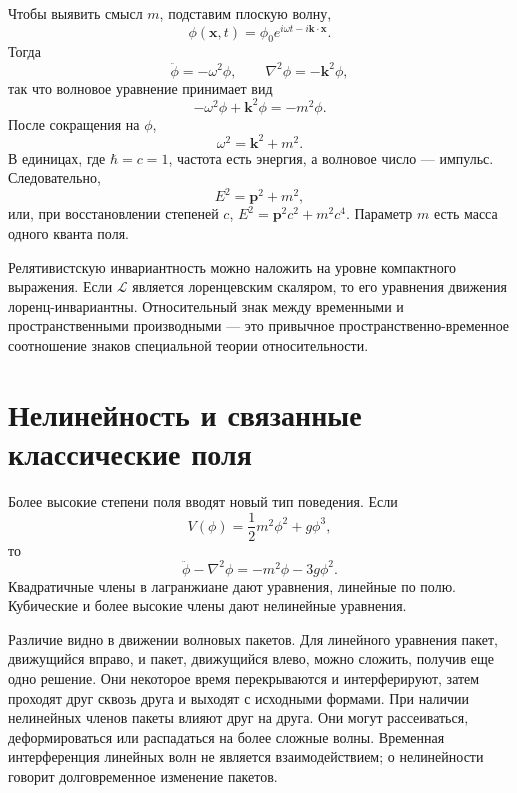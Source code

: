 Чтобы выявить смысл \(m\), подставим плоскую волну,
\begin{equation}
\phi(\mathbf x,t)=\phi_0e^{i\omega t-i\mathbf k\cdot\mathbf x}.
\end{equation}
Тогда
\begin{equation}
\ddot\phi=-\omega^2\phi,
\qquad
\nabla^2\phi=-\mathbf k^2\phi,
\end{equation}
так что волновое уравнение принимает вид
\begin{equation}
-\omega^2\phi+\mathbf k^2\phi=-m^2\phi.
\end{equation}
После сокращения на \(\phi\),
\begin{equation}
\omega^2=\mathbf k^2+m^2.
\end{equation}
В единицах, где \(\hbar=c=1\), частота есть энергия, а волновое число — импульс. Следовательно,
\begin{equation}
E^2=\mathbf p^2+m^2,
\end{equation}
или, при восстановлении степеней \(c\), \(E^2=\mathbf p^2c^2+m^2c^4\). Параметр \(m\) есть масса одного кванта поля.

Релятивистскую инвариантность можно наложить на уровне компактного выражения. Если \(\mathcal L\) является лоренцевским скаляром, то его уравнения движения лоренц-инвариантны. Относительный знак между временными и пространственными производными — это привычное пространственно-временное соотношение знаков специальной теории относительности.

\section{Нелинейность и связанные классические поля}

Более высокие степени поля вводят новый тип поведения. Если
\begin{equation}
V(\phi)=\frac12m^2\phi^2+g\phi^3,
\end{equation}
то
\begin{equation}
\ddot\phi-\nabla^2\phi=-m^2\phi-3g\phi^2.
\end{equation}
Квадратичные члены в лагранжиане дают уравнения, линейные по полю. Кубические и более высокие члены дают нелинейные уравнения.

Различие видно в движении волновых пакетов. Для линейного уравнения пакет, движущийся вправо, и пакет, движущийся влево, можно сложить, получив еще одно решение. Они некоторое время перекрываются и интерферируют, затем проходят друг сквозь друга и выходят с исходными формами. При наличии нелинейных членов пакеты влияют друг на друга. Они могут рассеиваться, деформироваться или распадаться на более сложные волны. Временная интерференция линейных волн не является взаимодействием; о нелинейности говорит долговременное изменение пакетов.

